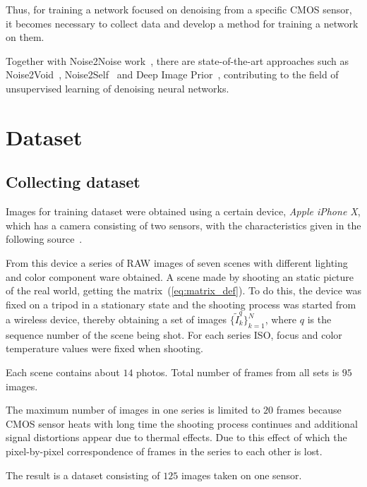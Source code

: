 \documentclass[runningheads]{llncs}
\begin{document}
Thus, for training a network focused on denoising from a specific CMOS sensor, it becomes necessary to collect data and develop a method for training a network on them.

Together with Noise2Noise work~\cite{noise2noise_paper}, there are state-of-the-art approaches such as Noise2Void~\cite{noise2void_paper}, Noise2Self~\cite{noise2self_paper} and Deep Image Prior~\cite{deep_image_prior_paper}, contributing to the field of unsupervised learning of denoising neural networks.


\section{Dataset}
\label{sec:dataset}

\subsection{Collecting dataset}

Images for training dataset were obtained using a certain device, \textit{Apple iPhone X}, which has a camera consisting of two sensors, with the characteristics given in the following source~\cite{camera_chars}.

From this device a series of RAW images of seven scenes with different lighting and color component ware obtained. A scene made by shooting an static picture of the real world, getting the matrix~(\ref{eq:matrix_def}). To do this, the device was fixed on a tripod in a stationary state and the shooting process was started from a wireless device, thereby obtaining a set of images $\{\tilde{I}^q_k\}_{k=1}^{N}$, where $q$ is the sequence number of the scene being shot. For each series ISO, focus and color temperature values were fixed when shooting.

Each scene contains about $14$ photos. Total number of frames from all sets is $ 95 $ images.

The maximum number of images in one series is limited to $20$ frames because CMOS sensor heats with long time the shooting process continues and additional signal distortions appear due to thermal effects. Due to this effect of which the pixel-by-pixel correspondence of frames in the series to each other is lost.

The result is a dataset consisting of $125$ images taken on one sensor.
\end{document}
